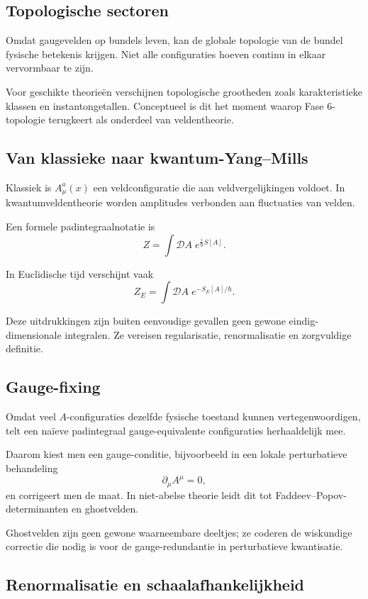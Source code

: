 \documentclass[11pt,a4paper]{article}
\begin{document}
\subsection{Topologische sectoren}

Omdat gaugevelden op bundels leven, kan de globale topologie van de bundel fysische betekenis krijgen. Niet alle configuraties hoeven continu in elkaar vervormbaar te zijn.

Voor geschikte theorieën verschijnen topologische grootheden zoals karakteristieke klassen en instantongetallen. Conceptueel is dit het moment waarop Fase 6-topologie terugkeert als onderdeel van veldentheorie.

\subsection{Van klassieke naar kwantum-Yang--Mills}

Klassiek is $A_\mu^a(x)$ een veldconfiguratie die aan veldvergelijkingen voldoet. In kwantumveldentheorie worden amplitudes verbonden aan fluctuaties van velden.

Een formele padintegraalnotatie is
\[
Z=\int \mathcal{D}A\;e^{\frac{i}{\hbar}S[A]}.
\]

In Euclidische tijd verschijnt vaak
\[
Z_E=\int \mathcal{D}A\;e^{-S_E[A]/\hbar}.
\]

Deze uitdrukkingen zijn buiten eenvoudige gevallen geen gewone eindig-dimensionale integralen. Ze vereisen regularisatie, renormalisatie en zorgvuldige definitie.

\subsection{Gauge-fixing}

Omdat veel $A$-configuraties dezelfde fysische toestand kunnen vertegenwoordigen, telt een naïeve padintegraal gauge-equivalente configuraties herhaaldelijk mee.

Daarom kiest men een gauge-conditie, bijvoorbeeld in een lokale perturbatieve behandeling
\[
\partial_\mu A^\mu=0,
\]
en corrigeert men de maat. In niet-abelse theorie leidt dit tot Faddeev--Popov-determinanten en ghostvelden.

Ghostvelden zijn geen gewone waarneembare deeltjes; ze coderen de wiskundige correctie die nodig is voor de gauge-redundantie in perturbatieve kwantisatie.

\subsection{Renormalisatie en schaalafhankelijkheid}
\end{document}
